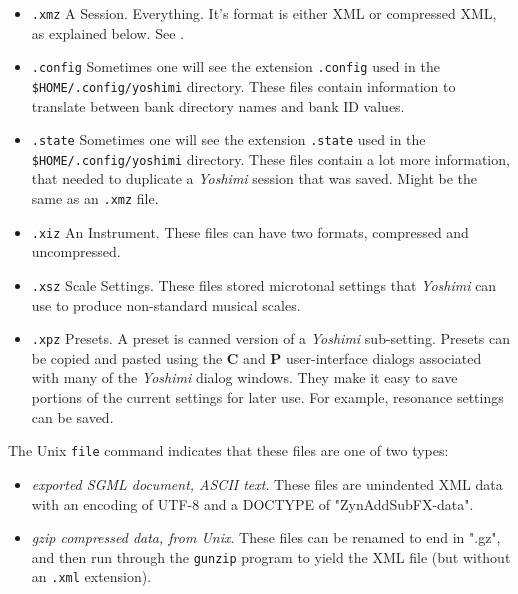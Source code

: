    \begin{itemize}
      \item \texttt{.xmz}
      A Session. Everything.  It's format is either XML
      or compressed XML, as explained below.
      See .
      \item \texttt{.config}
      Sometimes one will see the extension \texttt{.config} used in the
      \texttt{\$HOME/.config/yoshimi} directory.
      These files contain information to translate between bank directory
      names and bank ID values.
      \item \texttt{.state}
      Sometimes one will see the extension \texttt{.state} used in the
      \texttt{\$HOME/.config/yoshimi} directory.
      These files contain a lot more information, that needed to duplicate a
      \textsl{Yoshimi} session that was saved.  Might be the same
      as an \texttt{.xmz} file.
      \item \texttt{.xiz}
      An Instrument.  These files can have two formats, compressed and
      uncompressed.
      \item \texttt{.xsz}
      Scale Settings.
      These files stored microtonal settings that \textsl{Yoshimi}
      can use to produce non-standard musical scales.
      \item \texttt{.xpz}
      Presets.
      A preset is canned version of a \textsl{Yoshimi} sub-setting.
      Presets can be copied and pasted using the
      \textbf{C} and \textbf{P} user-interface dialogs associated with many
      of the \textsl{Yoshimi} dialog windows.
      They make it easy to save portions of the current settings for later
      use.  For example, resonance settings can be saved.
   \end{itemize}

   The Unix \texttt{file} command indicates that these files are one of
   two types:

   \begin{itemize}
      \item \textsl{exported SGML document, ASCII text}.
         These files are unindented XML data with an encoding of UTF-8 and
         a DOCTYPE of "ZynAddSubFX-data".
      \item \textsl{gzip compressed data, from Unix}.
         These files can be renamed to end in ".gz", and then run through
         the \texttt{gunzip} program to yield the XML file (but without an
         \texttt{.xml} extension).
   \end{itemize}

